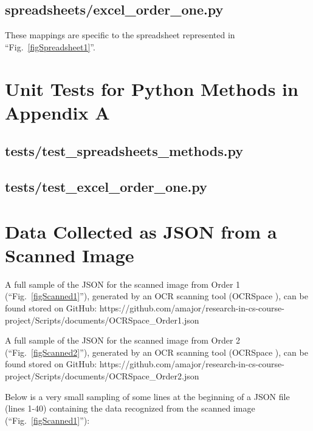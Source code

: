 \documentclass[conference]{IEEEtran}
\begin{document}
    \subsection{spreadsheets/excel\_order\_one.py}
    These mappings are specific to the spreadsheet represented in ``Fig.~\ref{figSpreadsheet1}''.
    

\newpage
\section{Unit Tests for Python Methods in Appendix A} \label{appendixOrderOneTests}
    \subsection{tests/test\_spreadsheets\_methods.py}
    

    \newpage
    \subsection{tests/test\_excel\_order\_one.py}
    

\newpage
\section{Data Collected as JSON from a Scanned Image} \label{appendixOrderOneJSON}
A full sample of the JSON for the scanned image from Order 1 (``Fig.~\ref{figScanned1}''), generated by an OCR scanning tool (OCRSpace \cite{ocrspace}), can be found stored on GitHub: https://github.com/amajor/research-in-cs-course-project/Scripts/documents/OCRSpace\_Order1.json

A full sample of the JSON for the scanned image from Order 2 (``Fig.~\ref{figScanned2}''), generated by an OCR scanning tool (OCRSpace \cite{ocrspace}), can be found stored on GitHub: https://github.com/amajor/research-in-cs-course-project/Scripts/documents/OCRSpace\_Order2.json

Below is a very small sampling of some lines at the beginning of a JSON file (lines 1-40) containing the data recognized from the scanned image (``Fig.~\ref{figScanned1}''):


% 
\end{document}
